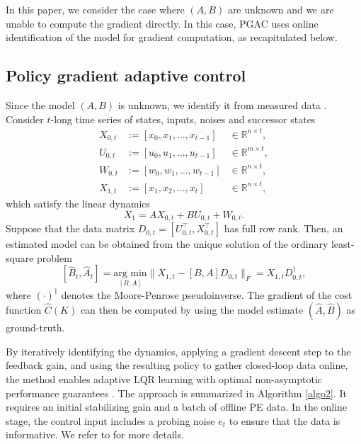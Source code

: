 \documentclass[letterpaper, 10 pt, conference]{ieeeconf}  %
\begin{document}
In this paper, we consider the case where $(A,B)$ are unknown and we are unable to compute the gradient directly. In this case, PGAC uses online identification of the model for gradient computation, as recapitulated below.

    \subsection{Policy gradient adaptive control}
Since the model $(A,B)$ is unknown, we identify it from measured data \cite{dorfler2021certainty}. Consider $t$-long time series of states, inputs, noises and successor states
\begin{equation}
\label{time_series}
    \begin{aligned}
        X_{0,t} &:= [x_0,x_1, \ldots, x_{t-1}] &\in \mathbb{R}^{n\times t}, \\
        U_{0,t} &:= [u_0,u_1, \ldots, u_{t-1}] &\in \mathbb{R}^{m\times t}, \\
        W_{0,t} &:= [w_0,w_1, \ldots, w_{t-1}] &\in \mathbb{R}^{n\times t}, \\
        X_{1,t} &:= [x_1,x_2, \ldots, x_t] &\in \mathbb{R}^{n\times t},
    \end{aligned}
\end{equation} 
which satisfy the linear dynamics
\begin{equation}
\label{system}
    X_1 = AX_{0,t} + BU_{0,t} + W_{0,t}.
\end{equation}
Suppose that the data matrix $D_{0,t} = [U_{0,t}^{\top}, X_{0,t}^{\top}]$ has full row rank. Then, an estimated model can be obtained from the unique solution of the ordinary least-square problem 
\begin{equation}
\label{OLS}
    [\hat{B}_t, \hat{A}_t] = \underset{[B, A]}{\text{arg min}} \| X_{1,t} - [B,A]D_{{0,t}}
    \|_F = X_{1,t} D_{0,t}^\dagger,
\end{equation}  
where $(\cdot)^\dagger$ denotes the Moore-Penrose pseudoinverse. The gradient of the cost function $\hat{C}(K)$ can then be computed by using the model estimate $(\hat{A}, \hat{B})$ as ground-truth.  

By iteratively identifying the dynamics, applying a gradient descent step to the feedback gain, and using the resulting policy to gather closed-loop data online, the method enables adaptive LQR learning with optimal non-asymptotic performance guarantees \cite{wang2021exact, lu2023almost}. The approach is summarized in Algorithm \ref{algo2}. It requires an initial stabilizing gain and a batch of offline PE data. In the online stage, the control input includes a probing noise $e_t$ to ensure that the data is informative. We refer to \cite{zhao2024data,zhao2025policy} for more details.
\end{document}
